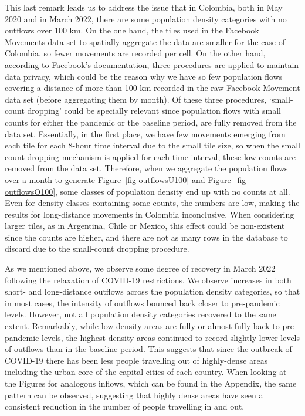 \documentclass[
  10pt,
  letterpaper,
  DIV=11,
  numbers=noendperiod]{scrartcl}
\begin{document}
This last remark leads us to address the issue that in Colombia, both in
May 2020 and in March 2022, there are some population density categories
with no outflows over 100 km. On the one hand, the tiles used in the
Facebook Movements data set to spatially aggregate the data are smaller
for the case of Colombia, so fewer movements are recorded per cell. On
the other hand, according to Facebook's documentation, three procedures
are applied to maintain data privacy, which could be the reason why we
have so few population flows covering a distance of more than 100 km
recorded in the raw Facebook Movement data set (before aggregating them
by month). Of these three procedures, `small-count dropping' could be
specially relevant since population flows with small counts for either
the pandemic or the baseline period, are fully removed from the data
set. Essentially, in the first place, we have few movements emerging
from each tile for each 8-hour time interval due to the small tile size,
so when the small count dropping mechanism is applied for each time
interval, these low counts are removed from the data set. Therefore,
when we aggregate the population flows over a month to generate
Figure~\ref{fig-outflowsU100} and Figure~\ref{fig-outflowsO100}, some
classes of population density end up with no counts at all. Even for
density classes containing some counts, the numbers are low, making the
results for long-distance movements in Colombia inconclusive. When
considering larger tiles, as in Argentina, Chile or Mexico, this effect
could be non-existent since the counts are higher, and there are not as
many rows in the database to discard due to the small-count dropping
procedure.

As we mentioned above, we observe some degree of recovery in March 2022
following the relaxation of COVID-19 restrictions. We observe increases
in both short- and long-distance outflows across the population density
categories, so that in most cases, the intensity of outflows bounced
back closer to pre-pandemic levels. However, not all population density
categories recovered to the same extent. Remarkably, while low density
areas are fully or almost fully back to pre-pandemic levels, the highest
density areas continued to record slightly lower levels of outflows than
in the baseline period. This suggests that since the outbreak of
COVID-19 there has been less people travelling out of highly-dense areas
including the urban core of the capital cities of each country. When
looking at the Figures for analogous inflows, which can be found in the
Appendix, the same pattern can be observed, suggesting that highly dense
areas have seen a consistent reduction in the number of people
travelling in and out.
\end{document}
